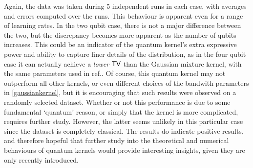 Again, the data was taken during 5 independent runs in each case, with averages and errors computed over the runs. This behaviour is apparent even for a range of learning rates. In the two qubit case, there is not a major difference between the two, but the discrepancy becomes more apparent as the number of qubits increases. This could be an indicator of the quantum kernel's extra expressive power and ability to capture finer details of the distribution, as in the four qubit case it can actually achieve a \textit{lower} $\operatorname{\textsf{TV}}$ than the Gaussian mixture kernel, with the same parameters used in ref.. Of course, this quantum kernel may not outperform all other kernels, or even different choices of the bandwith parameters in \eqref{gaussiankernel}, but it is encouraging that such results were observed on a randomly selected dataset. Whether or not this performance is due to some fundamental `quantum' reason, or simply that the kernel is more complicated, requires further study. However, the latter seems unlikely in this particular case since the dataset is completely classical. The results do indicate positive results, and therefore hopeful that further study into the theoretical and numerical behaviours of quantum kernels would provide interesting insights, given they are only recently introduced.

